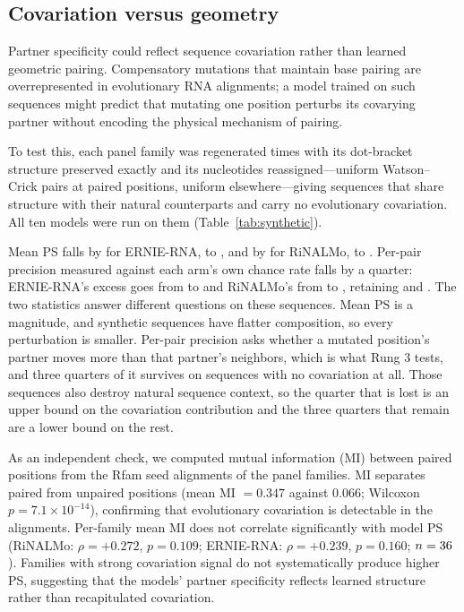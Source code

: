 \documentclass[11pt]{article}
\begin{document}
\subsection{Covariation versus geometry}
\label{sec:covariation-results}

Partner specificity could reflect sequence covariation rather than
learned geometric pairing. Compensatory mutations that maintain base
pairing are overrepresented in evolutionary RNA alignments; a model
trained on such sequences might predict that mutating one position
perturbs its covarying partner without encoding the physical mechanism
of pairing.

To test this, each panel family was regenerated \synPerFamily{} times with its
dot-bracket structure preserved exactly and its nucleotides reassigned---uniform
Watson--Crick pairs at paired positions, uniform elsewhere---giving \synN{}
sequences that share structure with their natural counterparts and carry no
evolutionary covariation. All ten models were run on them
(Table~\ref{tab:synthetic}).



Mean PS falls by \synPSDropErnieRNA{} for ERNIE-RNA, to \synPSErnieRNA{}, and
by \synPSDropRiNALMo{} for RiNALMo, to \synPSRiNALMo{}. Per-pair precision
measured against each arm's own chance rate falls by a quarter: ERNIE-RNA's
excess goes from \natExcessErnieRNA{} to \synExcessErnieRNA{} and RiNALMo's
from \natExcessRiNALMo{} to \synExcessRiNALMo{}, retaining
\synRetainedErnieRNA{} and \synRetainedRiNALMo{}. The two statistics answer
different questions on these sequences. Mean PS is a magnitude, and synthetic
sequences have flatter composition, so every perturbation is smaller. Per-pair
precision asks whether a mutated position's partner moves more than that
partner's neighbors, which is what Rung 3 tests, and three quarters of it
survives on sequences with no covariation at all. Those sequences also destroy
natural sequence context, so the quarter that is lost is an upper bound on the
covariation contribution and the three quarters that remain are a lower bound
on the rest.

As an independent check, we computed mutual information (MI) between
paired positions from the Rfam seed alignments of the \panelN{} panel families.
MI separates paired from unpaired positions (mean MI $= 0.347$ against
$0.066$; Wilcoxon $p = 7.1 \times 10^{-14}$), confirming that evolutionary
covariation is detectable in the alignments. Per-family mean MI does not
correlate significantly with model PS (RiNALMo: $\rho = +0.272$, $p = 0.109$;
ERNIE-RNA: $\rho = +0.239$, $p = 0.160$; $n = 36{}$). Families with strong covariation signal
do not systematically produce higher PS, suggesting that the models'
partner specificity reflects learned structure rather than
recapitulated covariation.
\end{document}
